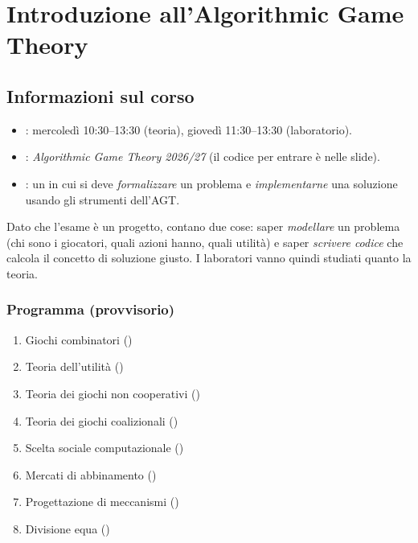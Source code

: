 \chapter{Introduzione all'Algorithmic Game Theory}

\parteteoria

\section{Informazioni sul corso}

\begin{itemize}
  \item {}: mercoledì 10:30--13:30 (teoria), giovedì 11:30--13:30 (laboratorio).
  \item {}: \emph{Algorithmic Game Theory 2026/27} (il codice per entrare è nelle slide).
  \item {}: un  in cui si deve \emph{formalizzare} un problema e
        \emph{implementarne} una soluzione usando gli strumenti dell'AGT.
\end{itemize}

\begin{osservazione}
Dato che l'esame è un progetto, contano due cose: saper \emph{modellare} un problema
(chi sono i giocatori, quali azioni hanno, quali utilità) e saper \emph{scrivere codice}
che calcola il concetto di soluzione giusto. I laboratori vanno quindi studiati quanto la teoria.
\end{osservazione}

\subsection*{Programma (provvisorio)}
\begin{enumerate}[label=\arabic*.]
  \item Giochi combinatori ()
  \item Teoria dell'utilità ()
  \item Teoria dei giochi non cooperativi ()
  \item Teoria dei giochi coalizionali ()
  \item Scelta sociale computazionale ()
  \item Mercati di abbinamento ()
  \item Progettazione di meccanismi ()
  \item Divisione equa ()
\end{enumerate}

